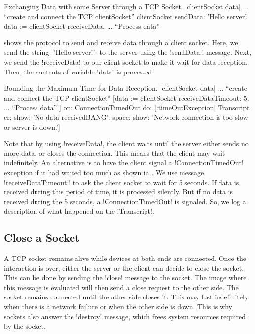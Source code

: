 \documentclass[a4paper,10pt,twoside]{book}
\begin{document}
\begin{script}[dataExhangeWithTcpSocket]{Exchanging Data with some Server through a TCP Socket.}
|clientSocket data|
... ``create and connect the TCP clientSocket''
clientSocket sendData: 'Hello server'.
data := clientSocket receiveData.
... ``Process data''
\end{script}

 shows the protocol to send and receive data through a client socket.
Here, we send the string \ct-'Hello server!'- to the server using the \ct!sendData:! message.
Next, we send the \ct!receiveData! to our client socket to make it wait for data reception.
Then, the contents of variable \ct!data! is processed.

\begin{script}[dataReceptionTimeOut]{Bounding the Maximum Time for Data Reception.}
|clientSocket data|
... ``create and connect the TCP clientSocket''
[data := clientSocket receiveDataTimeout: 5.
... ``Process data''
] on: ConnectionTimedOut 
do: [:timeOutException|
	Transcript 
		cr; 
		show: 'No data receivedBANG';
		space;
		show: 'Network connection is too slow or server is down.']
\end{script}

Note that by using  \ct!receiveData!, the client waits until the server either sends no more data, or closes the connection.
This means that the client may wait indefinitely.
An alternative is to have the client signal a \ct!ConnectionTimedOut! exception if it had waited too much as shown in .
We use message \ct!receiveDataTimeout:! to ask the client socket to wait for 5 seconds.
If data is received during this period of time, it is processed silently.
But if no data is received during the 5 seconds, a \ct!ConnectionTimedOut! is signaled.
So, we log a description of what happened on the \ct!Transcript!.

\subsection{Close a Socket}
A TCP socket remains alive while devices at both ends are connected.
Once the interaction is over, either the server or the client can decide to close the socket.
This can be done by sending the \ct!close! message to the socket.
The image where this message is evaluated will then send a close request to the other side.
The socket remains connected until the other side closes it.
This may last indefinitely when there is a network failure or when the other side is down.
This is why sockets also answer the \ct!destroy! message, which frees system resources required by the socket.
\end{document}

